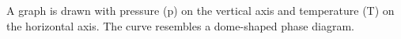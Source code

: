 A graph is drawn with pressure (p) on the vertical axis and temperature (T) on the horizontal axis. The curve resembles a dome-shaped phase diagram.